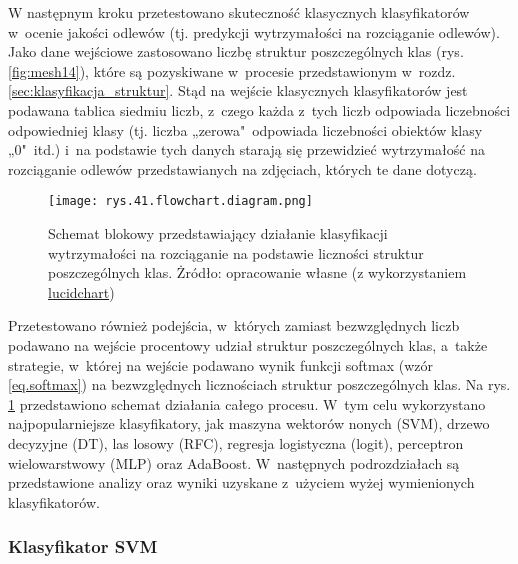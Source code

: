W następnym kroku przetestowano skuteczność klasycznych klasyfikatorów w~ocenie jakości odlewów (tj. predykcji wytrzymałości na rozciąganie odlewów). Jako dane wejściowe zastosowano liczbę struktur poszczególnych klas (rys. \ref{fig:mesh14}), które są pozyskiwane w~procesie przedstawionym w~rozdz. \ref{sec:klasyfikacja_struktur}. Stąd na wejście klasycznych klasyfikatorów jest podawana tablica siedmiu liczb, z~czego każda z~tych liczb odpowiada liczebności odpowiedniej klasy (tj. liczba „zerowa"~odpowiada liczebności obiektów klasy „0"~itd.) i~na podstawie tych danych starają się przewidzieć wytrzymałość na rozciąganie odlewów przedstawianych na zdjęciach, których te dane dotyczą. 
\begin{figure}[h]
    \centering
    \texttt{[image: rys.41.flowchart.diagram.png]}
    \caption{Schemat blokowy przedstawiający działanie klasyfikacji wytrzymałości na rozciąganie na podstawie liczności struktur poszczególnych klas. Żródło: opracowanie własne (z wykorzystaniem \href{https://www.lucidchart.com}{lucidchart})}
    \label{rys.41.flowchart.diagram.png}
\end{figure}
Przetestowano również podejścia, w~których zamiast bezwzględnych liczb podawano na wejście procentowy udział struktur poszczególnych klas, a~także strategie, w~której na wejście podawano wynik funkcji softmax (wzór \ref{eq.softmax}) na bezwzględnych licznościach struktur poszczególnych klas. Na rys. \ref{rys.41.flowchart.diagram.png} przedstawiono schemat działania całego procesu.
W~tym celu wykorzystano najpopularniejsze klasyfikatory, jak maszyna wektorów nonych (SVM), drzewo decyzyjne (DT), las losowy (RFC), regresja logistyczna (logit), perceptron wielowarstwowy (MLP) oraz AdaBoost. W~następnych podrozdziałach są przedstawione analizy oraz wyniki uzyskane z~użyciem wyżej wymienionych klasyfikatorów.

\subsubsection{Klasyfikator SVM}
\label{structures.with.svm}

